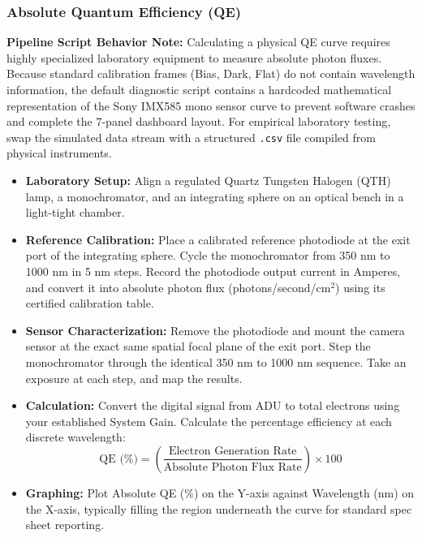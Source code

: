\documentclass[11pt,a4paper]{article}
\begin{document}
\subsubsection{Absolute Quantum Efficiency (QE)}
\textbf{Pipeline Script Behavior Note:} Calculating a physical QE curve requires highly specialized laboratory equipment to measure absolute photon fluxes. Because standard calibration frames (Bias, Dark, Flat) do not contain wavelength information, the default diagnostic script contains a hardcoded mathematical representation of the Sony IMX585 mono sensor curve to prevent software crashes and complete the 7-panel dashboard layout. For empirical laboratory testing, swap the simulated data stream with a structured \texttt{.csv} file compiled from physical instruments.
\begin{itemize}[leftmargin=*]
    \item \textbf{Laboratory Setup:} Align a regulated Quartz Tungsten Halogen (QTH) lamp, a monochromator, and an integrating sphere on an optical bench in a light-tight chamber.
    \item \textbf{Reference Calibration:} Place a calibrated reference photodiode at the exit port of the integrating sphere. Cycle the monochromator from 350 nm to 1000 nm in 5 nm steps. Record the photodiode output current in Amperes, and convert it into absolute photon flux (photons/second/cm$^2$) using its certified calibration table.
    \item \textbf{Sensor Characterization:} Remove the photodiode and mount the camera sensor at the exact same spatial focal plane of the exit port. Step the monochromator through the identical 350 nm to 1000 nm sequence. Take an exposure at each step, and map the results.
    \item \textbf{Calculation:} Convert the digital signal from ADU to total electrons using your established System Gain. Calculate the percentage efficiency at each discrete wavelength:
    $$ \text{QE (\%)} = \left(\frac{\text{Electron Generation Rate}}{\text{Absolute Photon Flux Rate}}\right) \times 100 $$
    \item \textbf{Graphing:} Plot Absolute QE (\%) on the Y-axis against Wavelength (nm) on the X-axis, typically filling the region underneath the curve for standard spec sheet reporting.
\end{itemize}
\end{document}
